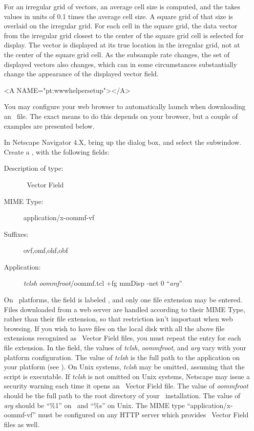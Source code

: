 For an irregular grid of vectors, an average cell size is computed,
and the  takes values in units of 0.1 times the
average cell size.  A square grid of that size is overlaid on the
irregular grid.  For each cell in the square grid, the data vector
from the irregular grid closest to the center of the square grid
cell is selected for display.  The vector is displayed at its true
location in the irregular grid, not at the center of the square
grid cell.  As the subsample rate changes, the set of displayed
vectors also changes, which can in some circumstances substantially
change the appearance of the displayed vector field.

\begin{rawhtml}
<A NAME="pt:wwwhelpersetup"></A>
\end{rawhtml}

You may configure your web browser to
automatically launch  when downloading an \OVF\ file.  The
exact means to do this depends on your browser, but a couple of examples
are presented below.

In Netscape Navigator 4.X, bring up the
 dialog box, and select the
  subwindow.  Create a
, with the following fields:
\begin{description}
\item[Description of type:] \OOMMF\ Vector Field
\item[MIME Type:] application/x-oommf-vf
\item[Suffixes:] ovf,omf,ohf,obf
\item[Application:]
{\em tclsh} {\em oommfroot}/oommf.tcl {+fg} mmDisp {-net} 0 ``{\em arg}''
\end{description}

On \Windows\ platforms, the  field is labeled
, and only one file extension may be entered.
Files downloaded from a web server are handled according to their
MIME Type, rather than their file extension, so that restriction
isn't important when web browsing.  If you wish to have files on the
local disk with all the above file extensions recognized as
\OOMMF\ Vector Field files, you must repeat the
 entry for each file extension.  In the 
field, the values of {\em tclsh}, {\em oommfroot}, and {\em arg} vary
with your platform configuration.  The value of {\em tclsh} is the full
path to the  application on your platform (see
).  On Unix
systems, {\em tclsh} may be omitted, assuming that the
 script is executable.  If {\em tclsh} is not omitted
on Unix systems, Netscape may issue a security warning each time it
opens an \OOMMF\ Vector Field file.  The value of {\em oommfroot} should
be the full path to the root directory of your \OOMMF\ installation.
The value of {\em arg} should be ``\%1'' on \Windows\ and ``\%s'' on
Unix.  The MIME type ``application/x-oommf-vf'' must be configured on
any HTTP server which provides \OOMMF\ Vector Field files as well.

